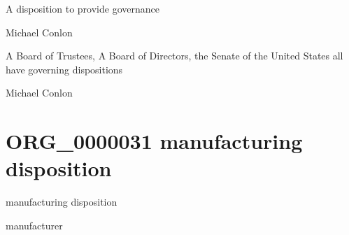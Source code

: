 \documentclass[letterpaper,10pt,english]{sphinxmanual}
\begin{document}
\begin{sphinxShadowBox}

\sphinxAtStartPar
A disposition to provide governance
\end{sphinxShadowBox}

\begin{sphinxShadowBox}

\sphinxAtStartPar
Michael Conlon 
\end{sphinxShadowBox}

\begin{sphinxShadowBox}

\sphinxAtStartPar
A Board of Trustees, A Board of Directors, the Senate of the United States all have governing dispositions
\end{sphinxShadowBox}

\begin{sphinxShadowBox}

\sphinxAtStartPar
Michael Conlon 
\end{sphinxShadowBox}
\begin{quote}
\label{\detokenize{doc-ORG_0000031:org-0000031}}\label{\detokenize{doc-ORG_0000031:manufacturing-disposition}}\label{\detokenize{doc-ORG_0000031:org-0000031}}
\ignorespaces \end{quote}


\section{ORG\_0000031 \sphinxhyphen{} manufacturing disposition}
\label{\detokenize{doc-ORG_0000031:org-0000031-manufacturing-disposition}}\label{\detokenize{doc-ORG_0000031:index-0}}\label{\detokenize{doc-ORG_0000031::doc}}
\begin{sphinxShadowBox}

\sphinxAtStartPar
manufacturing disposition
\end{sphinxShadowBox}

\begin{sphinxShadowBox}

\sphinxAtStartPar
manufacturer
\end{sphinxShadowBox}
\end{document}
